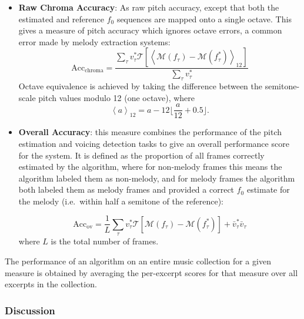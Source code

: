 \documentclass{article}
\begin{document}
\begin{itemize}
  \item \textbf{Raw Chroma Accuracy}: As raw pitch accuracy, except
  that both the estimated and reference $f_0$ sequences are mapped onto a
  single octave. This gives a measure of pitch accuracy which ignores octave
  errors, a common error made by melody extraction systems:
\begin{equation}
\text{Acc}_\text{chroma}= \frac{\sum_\tau v^*_\tau \mathcal{T}\left[\left<\mathcal{M}(f_\tau)-\mathcal{M}(f^*_\tau)\right>_{12} \right] }{\sum_\tau v^*_\tau}
\end{equation}
Octave equivalence is achieved by taking the difference between the semitone-scale pitch 
values modulo 12 (one octave), where
\begin{equation}
\left<a\right>_{12} = a - 12 \lfloor \frac{a}{12} + 0.5 \rfloor .
\end{equation}

  \item \textbf{Overall Accuracy}: this measure combines the performance of the
  pitch estimation and voicing detection tasks to give an overall performance
  score for the system. It is defined as the proportion of all frames
   correctly estimated by the algorithm, where for non-melody
  frames this means the algorithm labeled them as non-melody, and for melody
  frames the algorithm both labeled them as melody frames and provided a correct
  $f_0$ estimate for the melody (i.e.~within half a semitone of the
  reference):

\begin{equation}
\text{Acc}_\text{ov} 
= \frac{1}{L} \sum_\tau v^*_\tau \mathcal{T}\left[\mathcal{M}(f_\tau)-\mathcal{M}(f^*_\tau) \right] + \bar{v}^*_\tau \bar{v}_\tau 
\end{equation}
where $L$ is the total number of frames.
\end{itemize}

The performance of an algorithm on an entire music collection for a given
measure is obtained by averaging the per-excerpt scores for that measure over
all excerpts in the collection. 

\subsubsection{Discussion}
\end{document}
